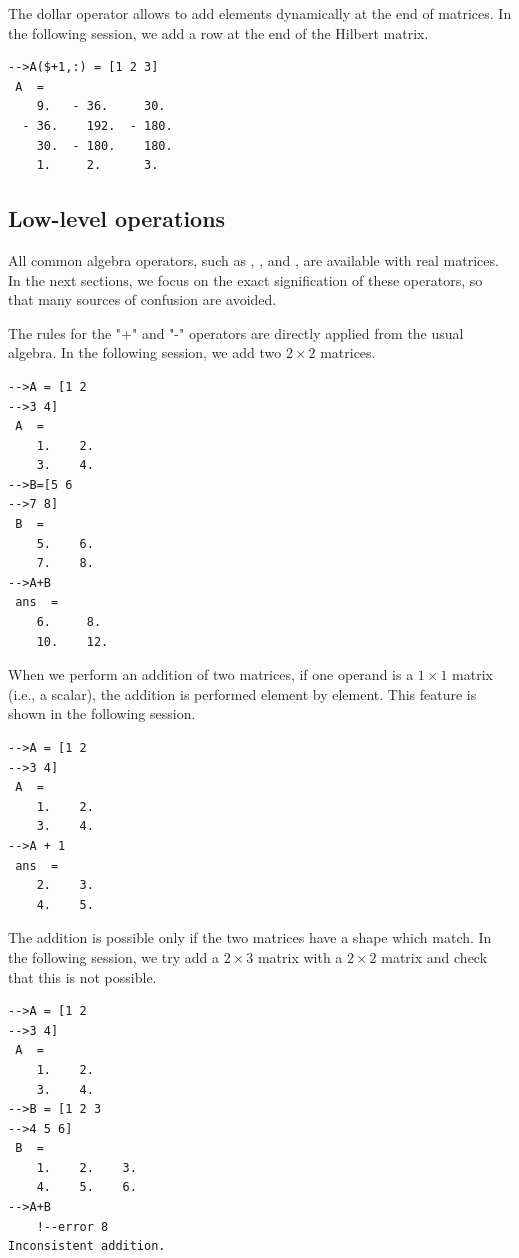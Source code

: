 The dollar \scivar{\$} operator allows to add elements dynamically
at the end of matrices. In the following session, we add 
a row at the end of the Hilbert matrix.
\lstset{language=scilabscript}
\begin{lstlisting}
-->A($+1,:) = [1 2 3]
 A  =
    9.   - 36.     30.   
  - 36.    192.  - 180.  
    30.  - 180.    180.  
    1.     2.      3.    
\end{lstlisting}


\subsection{Low-level operations}

All common algebra operators, such as \scivar{+}, \scivar{-}, \scivar{*} and 
\scivar{/}, are available with real matrices. 
In the next sections, we focus on the exact signification of these operators, so that many
sources of confusion are avoided.

The rules for the "+" and "-" operators are directly applied from the usual
algebra. In the following session, we add two $2\times 2$ matrices.
\lstset{language=scilabscript}
\begin{lstlisting}
-->A = [1 2
-->3 4]
 A  =
    1.    2.  
    3.    4.  
-->B=[5 6
-->7 8]
 B  =
    5.    6.  
    7.    8.  
-->A+B
 ans  =
    6.     8.   
    10.    12.  
\end{lstlisting}

When we perform an addition of two matrices, if one operand is a 
$1\times 1$ matrix (i.e., a scalar), the addition is performed element by element. 
This feature is shown in the following session.

\lstset{language=scilabscript}
\begin{lstlisting}
-->A = [1 2
-->3 4]
 A  =
    1.    2.  
    3.    4.  
-->A + 1
 ans  =
    2.    3.  
    4.    5.  
\end{lstlisting}

The addition is possible only if the two matrices have a 
shape which match. In the following session, we try add a 
$2\times 3$ matrix with a $2\times 2$ matrix and check
that this is not possible.

\lstset{language=scilabscript}
\begin{lstlisting}
-->A = [1 2
-->3 4]
 A  =
    1.    2.  
    3.    4.  
-->B = [1 2 3
-->4 5 6]
 B  =
    1.    2.    3.  
    4.    5.    6.  
-->A+B
    !--error 8 
Inconsistent addition.
\end{lstlisting}

